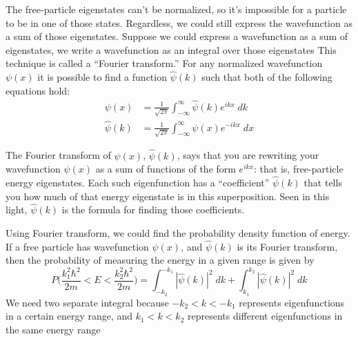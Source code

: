 \documentclass[../../main.tex]{subfiles}
\begin{document}
The free-particle eigenstates can't be normalized, so it's impossible for a particle to be in one of those states. Regardless, we could still express the wavefunction as a sum of those eigenstates. Suppose we could express a wavefunction as a sum of eigenstates, we write a wavefunction as an integral over those eigenstates This technique is called a “Fourier transform.” For any normalized wavefunction ${\psi}(x)$ it is possible to find a function $\hat{\psi}(k)$ such that both of the following equations hold:
\begin{align*}
    \psi(x)&= \frac{1}{\sqrt{2\pi}} \int_{-\infty}^{\infty}\hat{\psi}(k) e^{ikx}\;dk\\
    \hat{\psi}(k)&= \frac{1}{\sqrt{2\pi}} \int_{-\infty}^{\infty}\psi(x) e^{-ikx}\;dx
\end{align*}

The Fourier transform of ${\psi}(x)$, $\hat{\psi}(k)$, says that you are rewriting your wavefunction ${\psi}(x)$ as a sum of functions of the form $e^{ikx}$: that is, free-particle energy eigenstates. Each such eigenfunction has a “coefficient” $\hat{\psi}(k)$ that tells you how much of that energy eigenstate is in this superposition. Seen in this light, $\hat{\psi}(k)$ is the formula for finding those coefficients.

Using Fourier transform, we could find the probability density function of energy. If a free particle has wavefunction ${\psi}(x)$, and $\hat{\psi}(k)$ is its Fourier transform, then the probability of measuring the energy in a given range is given by
\begin{equation*}
    P\biggl( \frac{k_1^2\hbar^2}{2m}<E< \frac{k_2^2\hbar^2}{2m}\biggr)=\int_{-k_2}^{-k_1}|\hat{\psi}(k)|^2\;dk+\int_{k_1}^{k_2}|\hat{\psi}(k)|^2\;dk
\end{equation*}
We need two separate integral because $-k_2 < k < - k_1$ represents eigenfunctions in a certain energy range, and $k_1 < k < k_2$ represents different eigenfunctions in the same energy range
\end{document}
